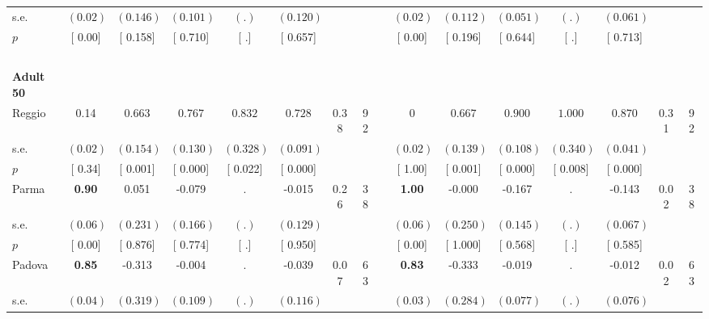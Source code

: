 \begin{longtable}{L{8em} c c c c c c c p{1em} c c c c c c c}
\quad \quad \quad \quad s.e.& $ (     0.02)$ & $ (    0.146)$ & $ (    0.101)$ & $ (        .)$ & $ (    0.120)$ & & & & $ (     0.02)$ & $ (    0.112)$ & $ (    0.051)$ & $ (        .)$ & $ (    0.061)$ & &  \\*
\quad \quad \quad \quad $ p$ & [     0.00] & [    0.158] & [    0.710] & [        .] & [    0.657] & & & & [     0.00] & [    0.196] & [    0.644] & [        .] & [    0.713] & &  \\[1em]
~\\[1em]
\quad \quad \textbf{Adult 50} & & & & & & & & & & & & & & & \\* 
\quad \quad \quad Reggio& 0.14 & $ \mathbf{    0.663}$ & $ \mathbf{    0.767}$ & $ \mathbf{    0.832}$ & $ \mathbf{    0.728}$ &      0.38 &        92 & & 0 & $ \mathbf{    0.667}$ & $ \mathbf{    0.900}$ & $ \mathbf{    1.000}$ & $ \mathbf{    0.870}$ &      0.31 &        92  \\*
\quad \quad \quad \quad s.e.& $ (     0.02)$ & $ (    0.154)$ & $ (    0.130)$ & $ (    0.328)$ & $ (    0.091)$ & & & & $ (     0.02)$ & $ (    0.139)$ & $ (    0.108)$ & $ (    0.340)$ & $ (    0.041)$ & &  \\*
\quad \quad \quad \quad $ p$ & [     0.34] & [    0.001] & [    0.000] & [    0.022] & [    0.000] & & & & [     1.00] & [    0.001] & [    0.000] & [    0.008] & [    0.000] & &  \\[1em]
\quad \quad \quad Parma& \textbf{     0.90} &     0.051 &    -0.079 &         . &    -0.015 &      0.26 &        38 & & \textbf{     1.00} &    -0.000 &    -0.167 &         . &    -0.143 &      0.02 &        38  \\*
\quad \quad \quad \quad s.e.& $ (     0.06)$ & $ (    0.231)$ & $ (    0.166)$ & $ (        .)$ & $ (    0.129)$ & & & & $ (     0.06)$ & $ (    0.250)$ & $ (    0.145)$ & $ (        .)$ & $ (    0.067)$ & &  \\*
\quad \quad \quad \quad $ p$ & [     0.00] & [    0.876] & [    0.774] & [        .] & [    0.950] & & & & [     0.00] & [    1.000] & [    0.568] & [        .] & [    0.585] & &  \\[1em]
\quad \quad \quad Padova& \textbf{     0.85} &    -0.313 &    -0.004 &         . &    -0.039 &      0.07 &        63 & & \textbf{     0.83} &    -0.333 &    -0.019 &         . &    -0.012 &      0.02 &        63  \\*
\quad \quad \quad \quad s.e.& $ (     0.04)$ & $ (    0.319)$ & $ (    0.109)$ & $ (        .)$ & $ (    0.116)$ & & & & $ (     0.03)$ & $ (    0.284)$ & $ (    0.077)$ & $ (        .)$ & $ (    0.076)$ & &  \\*

\end{longtable}
